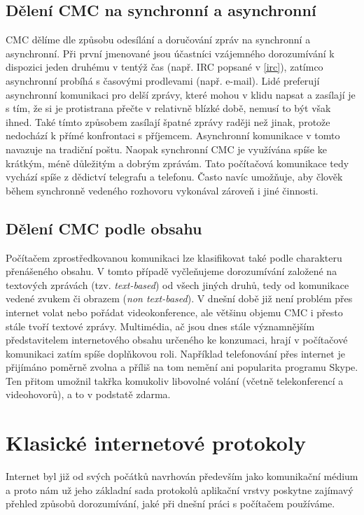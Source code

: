 \documentclass[12pt,oneside,final]{fithesis2}
\begin{document}
\subsection{Dělení CMC na synchronní a asynchronní}
CMC dělíme dle způsobu odesílání a doručování zpráv na synchronní a asynchronní. Při první jmenované jsou účastníci vzájemného dorozumívání k dispozici jeden druhému v tentýž čas (např. IRC popsané v \ref{irc}), zatímco asynchronní probíhá s časovými prodlevami (např. e-mail). Lidé preferují asynchronní komunikaci pro delší zprávy, které mohou v klidu napsat a zasílají je s tím, že si je protistrana přečte v relativně blízké době, nemusí to být však ihned. Také tímto způsobem zasílají špatné zprávy raději než jinak, protože nedochází k přímé konfrontaci s příjemcem. Asynchronní komunikace v tomto navazuje na tradiční poštu. Naopak synchronní CMC je využívána spíše ke krátkým, méně důležitým a dobrým zprávám. Tato počítačová komunikace tedy vychází spíše z dědictví telegrafu a telefonu. Často navíc umožňuje, aby člověk během synchronně vedeného rozhovoru vykonával zároveň i jiné činnosti.

\subsection{Dělení CMC podle obsahu}
Počítačem zprostředkovanou komunikaci lze klasifikovat také podle charakteru přenášeného obsahu. V tomto případě vyčleňujeme dorozumívání založené na textových zprávách (tzv. {\it text-based}) od všech jiných druhů, tedy od komunikace vedené zvukem či obrazem ({\it non text-based}). V dnešní době již není problém přes internet volat nebo pořádat videokonference, ale většinu objemu CMC i přesto stále tvoří textové zprávy. Multimédia, ač jsou dnes stále významnějším představitelem internetového obsahu určeného ke konzumaci, hrají v počítačové komunikaci zatím spíše doplňkovou roli. Například telefonování přes internet je přijímáno poměrně zvolna \cite{latif2007adoption} a příliš na tom nemění ani popularita programu Skype. Ten přitom umožnil takřka komukoliv libovolné volání (včetně telekonferencí a videohovorů), a to v podstatě zdarma.


\section{Klasické internetové protokoly}\label{protocols}
Internet byl již od svých počátků navrhován především jako komunikační médium a proto nám už jeho základní sada protokolů aplikační vrstvy poskytne zajímavý přehled způsobů dorozumívání, jaké při dnešní práci s počítačem používáme.
\end{document}
